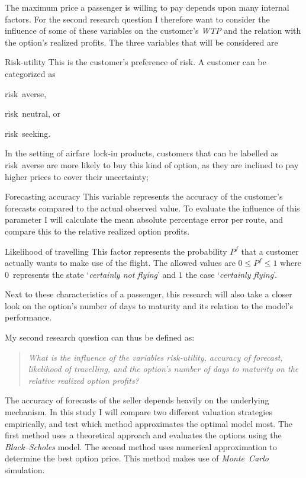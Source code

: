 The maximum price a passenger is willing to pay depends upon many internal factors. For the second research question I therefore want to consider the influence of some of these variables on the customer's \emph{WTP} and the relation with the option's realized profits. The three variables that will be considered are
\begin{compactdesc}
\item[Risk-utility] This is the customer's preference of risk. A customer can be categorized as \begin{inparaenum}
\item risk~averse,
\item risk~neutral, or
\item risk~seeking.
\end{inparaenum} In the setting of airfare~lock-in products, customers that can be labelled as risk~averse are more likely to buy this kind of option, as they are inclined to pay higher prices to cover their uncertainty;
\item[Forecasting accuracy] This variable represents the accuracy of the customer's forecasts compared to the actual observed value. To evaluate the influence of this parameter I will calculate the mean absolute percentage error per route, and compare this to the relative realized option profits.
\item[Likelihood of travelling] This factor represents the probability $P^f$ that a customer actually wants to make use of the flight. The allowed values are $0 \le P^f \le 1$ where $0$~represents the state `\emph{certainly not flying}' and $1$ the case  `\emph{certainly flying}'.
\vspace{1em}
\end{compactdesc}

Next to these characteristics of a passenger, this research will also take a closer look on the option's number of days to maturity and its relation to the model's performance.

\noindent
My second research question can thus be defined as:
\begin{quote}\emph{What is the influence of the variables risk-utility, accuracy of forecast, likelihood of travelling, and the option's number of days to maturity on the relative realized option profits?}\end{quote}

The accuracy of forecasts of the seller depends heavily on the underlying mechanism. In this study I will compare two different valuation strategies empirically, and test which meth\-od ap\-prox\-i\-mates the optimal model most. The first method uses a theoretical approach and evaluates the options using the \emph{Black--Scholes} model. The second method uses numerical approximation to determine the best option price. This method makes use of \emph{Monte~Carlo} simulation.

